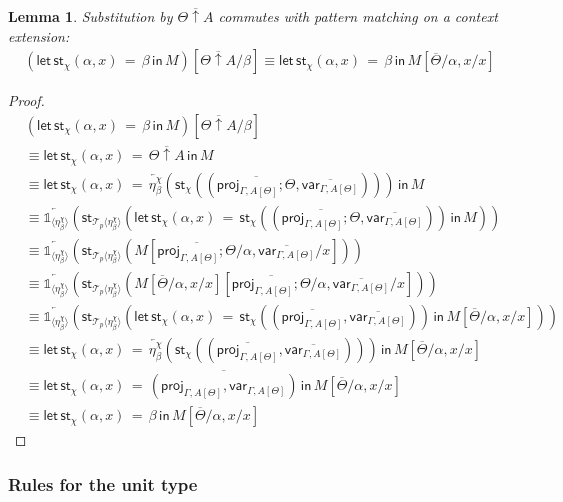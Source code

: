 \documentclass[10pt]{article}
\newtheorem{lemma}{Lemma}
\theoremstyle{definition}
\newcommand{\rewrite}[2]{\overleftarrow{#1}(#2)}
\newcommand\StI[2]{\ensuremath{\mathsf{st}_{#1}(#2)}}
\newcommand\StE[4]{\ensuremath{\mathsf{let} \, \StI{#1}{#3} \, = \, {#2} \, \mathsf{in} \, #4}}
\newcommand\ApEl[2]{\mathcal{T}_{#1}\langle#2\rangle}
\newcommand{\upstairs}[1]{\overline{#1}}
\newcommand\proj[1]{\ensuremath{\mathsf{proj}_{#1}}}
\newcommand\qvar[1]{\ensuremath{\mathsf{var}_{#1}}}
\newcommand\One{\ensuremath{\mathds{1}}}
\newcommand\ApOne[1]{\ensuremath{\One_{\langle {#1} \rangle }}}
\begin{document}
\begin{lemma}\label{lem:match-uparrow}
Substitution by $\upstairs{\Theta \uparrow A}$ commutes with pattern matching on a context extension:
\begin{align*}
(\StE{\chi}{\beta}{\alpha, x}{M})[\upstairs{\Theta \uparrow A}/\beta] \equiv \StE{\chi}{\beta}{\alpha, x}{M[\upstairs{\Theta}/\alpha, x / x]}
\end{align*}
\end{lemma}
\begin{proof}
\begin{align*}
&(\StE{\chi}{\beta}{\alpha, x}{M})[\upstairs{\Theta \uparrow A}/\beta] \\
&\equiv \StE{\chi}{\upstairs{\Theta \uparrow A}}{\alpha, x}{M} \\
&\equiv \StE{\chi}{\rewrite{\eta^\chi_\beta}{\StI{\chi}{(\upstairs{\proj{\Gamma, A[\Theta]}; \Theta}, \upstairs{\qvar{\Gamma, A[\Theta]}})}}}{\alpha, x}{M} \\
&\equiv \rewrite{\ApOne{\eta^\chi_\beta}}{\StI{\ApEl{p}{\eta^\chi_\beta}}{\StE{\chi}{\StI{\chi}{(\upstairs{\proj{\Gamma, A[\Theta]}; \Theta}, \upstairs{\qvar{\Gamma, A[\Theta]}})}}{\alpha, x}{M}}} \\
&\equiv \rewrite{\ApOne{\eta^\chi_\beta}}{\StI{\ApEl{p}{\eta^\chi_\beta}}{M[\upstairs{\proj{\Gamma, A[\Theta]}; \Theta} / \alpha, \upstairs{\qvar{\Gamma, A[\Theta]}}/x]}} \\
&\equiv \rewrite{\ApOne{\eta^\chi_\beta}}{\StI{\ApEl{p}{\eta^\chi_\beta}}{M[\upstairs{\Theta}/\alpha, x / x][\upstairs{\proj{\Gamma, A[\Theta]}; \Theta} / \alpha, \upstairs{\qvar{\Gamma, A[\Theta]}}/x]}} \\
&\equiv \rewrite{\ApOne{\eta^\chi_\beta}}{\StI{\ApEl{p}{\eta^\chi_\beta}}{\StE{\chi}{\StI{\chi}{(\upstairs{\proj{\Gamma, A[\Theta]}}, \upstairs{\qvar{\Gamma, A[\Theta]}})}}{\alpha, x}{M[\upstairs{\Theta}/\alpha, x / x]}}} \\
&\equiv \StE{\chi}{\rewrite{\eta^\chi_\beta}{\StI{\chi}{(\upstairs{\proj{\Gamma, A[\Theta]}}, \upstairs{\qvar{\Gamma, A[\Theta]}})}}}{\alpha, x}{M[\upstairs{\Theta}/\alpha, x / x]} \\
&\equiv \StE{\chi}{\upstairs{(\proj{\Gamma, A[\Theta]},\qvar{\Gamma, A[\Theta]})}}{\alpha, x}{M[\upstairs{\Theta}/\alpha, x / x]} \\
&\equiv \StE{\chi}{\beta}{\alpha, x}{M[\upstairs{\Theta}/\alpha, x / x]}
\end{align*}
\end{proof}

\subsubsection{Rules for the unit type}
\end{document}
